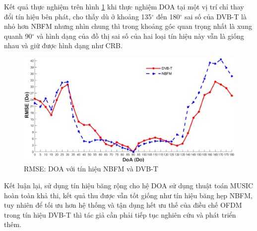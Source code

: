 \newpage
Kết quả thực nghiệm trên hình \ref{fig:dvbt_3} khi thực nghiệm DOA tại một vị trí chỉ thay đổi tín hiệu bên phát, cho thấy dù ở khoảng 135$^{\circ}$ đến 180$^{\circ}$ sai số của DVB-T là nhỏ hơn NBFM nhưng nhìn chung thì trong khoảng góc quan trọng nhất là xung quanh 90$^{\circ}$ và hình dạng của đồ thị sai số của hai loại tín hiệu này vẫn là giống nhau và giữ được hình dạng như CRB.
\begin{figure} [!h]
	\centering
	\includegraphics[width=1\linewidth]{figures/dvbt_3.png}
	\caption{RMSE: DOA với tín hiệu NBFM và DVB-T}
	\label{fig:dvbt_3}
\end{figure}

Kết luận lại, sử dụng tín hiệu băng rộng cho hệ DOA sử dụng thuật toán MUSIC hoàn toàn khả thi, kết quả thu được vẫn tốt giống như tín hiệu băng hẹp NBFM, tuy nhiên để tối ưu hơn hệ thống và tận dụng hết ưu thế của điều chế OFDM trong tín hiệu DVB-T thì tác giả cần phải tiếp tục nghiên cứu và phát triển thêm.


